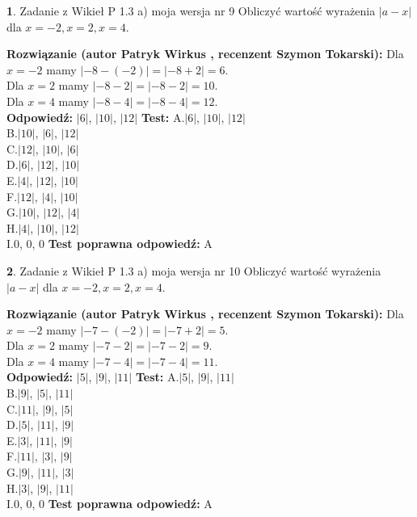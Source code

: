 \documentclass[12pt, a4paper]{article}
\theoremstyle{definition} %
\newtheorem{zad}{}
\newcommand{\zadStart}[1]{\begin{zad}#1\newline}
\newcommand{\zadStop}{\end{zad}}
\newcommand{\rozwStart}[2]{\noindent \textbf{Rozwiązanie (autor #1 , recenzent #2): }\newline}
\newcommand{\rozwStop}{\newline}
\newcommand{\odpStart}{\noindent \textbf{Odpowiedź:}\newline}
\newcommand{\odpStop}{\newline}
\newcommand{\testStart}{\noindent \textbf{Test:}\newline}
\newcommand{\testStop}{\newline}
\newcommand{\kluczStart}{\noindent \textbf{Test poprawna odpowiedź:}\newline}
\newcommand{\kluczStop}{\newline}
\begin{document}
\zadStart{Zadanie z Wikieł P 1.3 a) moja wersja nr 9}
Obliczyć wartość wyrażenia $|a - x|$ dla $x=-2,x=2,x=4$.
\zadStop
\rozwStart{Patryk Wirkus}{Szymon Tokarski}
Dla $x = -2$ mamy $|-8 - (-2)| = |-8 + 2| = 6$.\\
Dla $x = 2$ mamy $|-8 - 2| = |-8 - 2| = 10$.\\
Dla $x = 4$ mamy $|-8 - 4| = |-8 - 4| = 12$.\\
\rozwStop
\odpStart
$|6|$, $|10|$, $|12|$
\odpStop
\testStart
A.$|6|$, $|10|$, $|12|$\\
B.$|10|$, $|6|$, $|12|$\\
C.$|12|$, $|10|$, $|6|$\\
D.$|6|$, $|12|$, $|10|$\\
E.$|4|$, $|12|$, $|10|$\\
F.$|12|$, $|4|$, $|10|$\\
G.$|10|$, $|12|$, $|4|$\\
H.$|4|$, $|10|$, $|12|$\\
I.$0$, $0$, $0$
\testStop
\kluczStart
A
\kluczStop



\zadStart{Zadanie z Wikieł P 1.3 a) moja wersja nr 10}
Obliczyć wartość wyrażenia $|a - x|$ dla $x=-2,x=2,x=4$.
\zadStop
\rozwStart{Patryk Wirkus}{Szymon Tokarski}
Dla $x = -2$ mamy $|-7 - (-2)| = |-7 + 2| = 5$.\\
Dla $x = 2$ mamy $|-7 - 2| = |-7 - 2| = 9$.\\
Dla $x = 4$ mamy $|-7 - 4| = |-7 - 4| = 11$.\\
\rozwStop
\odpStart
$|5|$, $|9|$, $|11|$
\odpStop
\testStart
A.$|5|$, $|9|$, $|11|$\\
B.$|9|$, $|5|$, $|11|$\\
C.$|11|$, $|9|$, $|5|$\\
D.$|5|$, $|11|$, $|9|$\\
E.$|3|$, $|11|$, $|9|$\\
F.$|11|$, $|3|$, $|9|$\\
G.$|9|$, $|11|$, $|3|$\\
H.$|3|$, $|9|$, $|11|$\\
I.$0$, $0$, $0$
\testStop
\kluczStart
A
\kluczStop
\end{document}
